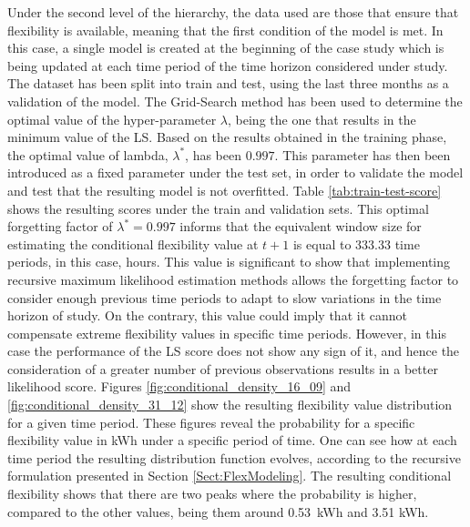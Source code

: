 Under the second level of the hierarchy, the data used are those that ensure that flexibility is available, meaning that the first condition of the model is met. In this case, a single model is created at the beginning of the case study which is being updated at each time period of the time horizon considered under study. The dataset has been split into train and test, using the last three months as a validation of the model. The Grid-Search method has been used to determine the optimal value of the hyper-parameter $\lambda$, being the one that results in the minimum value of the LS.  Based on the results obtained in the training phase, the optimal value of lambda, $\lambda^{*}$, has been $0.997$. This parameter has then been introduced as a fixed parameter under the test set, in order to validate the model and test that the resulting model is not overfitted. Table \ref{tab:train-test-score} shows the resulting scores under the train and validation sets. This optimal forgetting factor of $\lambda^{*} = 0.997$ informs that the equivalent window size for estimating the conditional flexibility value at $t+1$ is equal to 333.33 time periods, in this case, hours. This value is significant to show that implementing recursive maximum likelihood estimation methods allows the forgetting factor to consider enough previous time periods to adapt to slow variations in the time horizon of study. On the contrary, this value could imply that it cannot compensate extreme flexibility values in specific time periods. However, in this case the performance of the LS score does not show any sign of it, and hence the consideration of a greater number of previous observations results in a better likelihood score. 
Figures \ref{fig:conditional_density_16_09} and \ref{fig:conditional_density_31_12} show the resulting flexibility value distribution for a given time period. These figures reveal the probability for a specific flexibility value in kWh under a specific period of time. One can see how at each time period the resulting distribution function evolves, according to the recursive formulation presented in Section \ref{Sect:FlexModeling}. The resulting conditional flexibility shows that there are two peaks where the probability is higher, compared to the other values, being them around 0.53~kWh and 3.51 kWh. 


